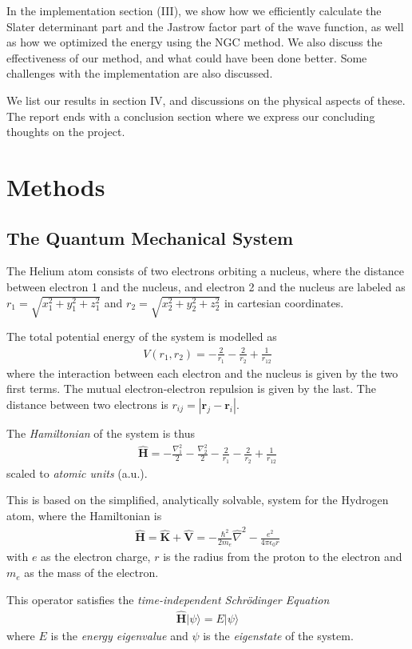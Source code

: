 \documentclass[twocolumns, a4paper,11pt,fleqn]{extarticle}
\newcommand{\eq}[1]{{\small\begin{align*}#1\end{align*}}}
\newcommand{\equ}[1]{{\small\begin{align}#1\end{align}}}
\newcommand{\ket}[1]{|#1\rangle}
\renewcommand\vec[1]{\boldsymbol{\mathbf{#1}}}
\newcommand{\OP}[1]{\mathbf{\widehat{#1}}}
\newcommand{\op}[1]{\hat{#1}}
\begin{document}
In the implementation section (III), we show how we efficiently calculate the
Slater determinant part and the Jastrow factor part of the wave function,
as well as how we optimized the energy using the NGC method.
We also discuss the effectiveness of our method, and what could have been done better.
Some challenges with the implementation are also discussed.

We list our results in section IV, and discussions on the physical aspects of these.
The report ends with a conclusion section where we express our concluding thoughts
on the project.

\section{Methods}
\subsection{The Quantum Mechanical System}
The Helium atom consists of two electrons orbiting a nucleus,
where the distance between electron 1 and the nucleus,
and electron 2 and the nucleus are labeled as
$r_1 = \sqrt{x_1^2 + y_1^2 + z_1^2}$ 
and $r_2 = \sqrt{x_2^2 + y_2^2 + z_2^2}$ in cartesian coordinates.

The total potential energy of the system is modelled as
{\small
\eq{
    V(r_1,r_2)=-\frac{2}{r_1}-\frac{2}{r_2}+\frac{1}{r_{12}}
}}%
where the interaction between each electron and the nucleus
is given by the two first terms. 
The mutual electron-electron repulsion is given by the last.
The distance between two electrons is $r_{ij}=|\vec r_j-\vec r_i|$.

The \textit{Hamiltonian} of the system is thus
\eq{
    \OP H = -\frac{\nabla_1 ^2}{2} -\frac{\nabla_2 ^2}{2}
    -\frac{2}{r_1}-\frac{2}{r_2}+\frac{1}{r_{12}}
}
scaled to \textit{atomic units} (a.u.).

This is based on the simplified, analytically solvable, system for the 
Hydrogen atom, where the Hamiltonian is
\equ{
  \OP H = \OP K + \OP V = -\frac{\hbar^2}{2m_e}\op \nabla^2 
  - \frac{e^2}{4\pi \epsilon_0 r} \label{eq:hydro}
}
with $e$ as the electron charge, $r$ is the radius from the proton to the electron
and $m_e$ as the mass of the electron.

This operator satisfies the \textit{time-independent Schr\"odinger Equation}
\equ{
  \OP H \ket{\psi} = E \ket{\psi}\label{eq:schrod}
}
where $E$ is the \textit{energy eigenvalue} and $\psi$ is the \textit{eigenstate} of the system.
\end{document}
